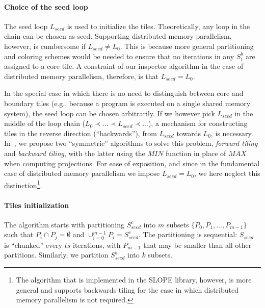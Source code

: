\paragraph{Choice of the seed loop}
The seed loop $L_{seed}$ is used to initialize the tiles. Theoretically, any loop in the chain can be chosen as seed. Supporting distributed memory parallelism, however, is cumbersome if $L_{seed} \neq L_0$. This is because more general partitioning and coloring schemes would be needed to ensure that no iterations in any $S_i^{b}$ are assigned to a core tile. A constraint of our inspector algorithm in the case of distributed memory parallelism, therefore, is that $L_{seed} = L_0$. 

In the special case in which there is no need to distinguish between core and boundary tiles (e.g., because a program is executed on a single shared memory system), the seed loop can be chosen arbitrarily. If we however pick $L_{seed}$ in the middle of the loop chain ($L_0 \prec ... \prec L_{seed} \prec ...$), a mechanism for constructing tiles in the reverse direction (``backwards''), from $L_{seed}$ towards $L_0$, is necessary. In~\cite{st-paper}, we propose two ``symmetric'' algorithms to solve this problem, \textit{forward tiling} and \textit{backward tiling}, with the latter using the $MIN$ function in place of $MAX$ when computing projections. For ease of exposition, and since in the fundamental case of distributed memory parallelism we impose $L_{seed} = L_0$, we here neglect this distinction\footnote{The algorithm that is implemented in the SLOPE library, however, is more general and supports backwards tiling for the case in which distributed memory parallelism is not required.}. 


\paragraph{Tiles initialization}
The algorithm starts with partitioning $S_{seed}^{c}$ into $m$ subsets $\lbrace P_0, P_1, ..., P_{m-1}\rbrace$ such that $P_i \cap P_j = \emptyset$ and $\cup_{i = 0}^{m-1} P_i = S_{seed}^{c}$. The partitioning is sequential: $S_{seed}$ is ``chunked'' every $ts$ iterations, with $P_{m-1}$ that may be smaller than all other partitions. Similarly, we partition $S_{seed}^{b}$ into $k$ subsets.

